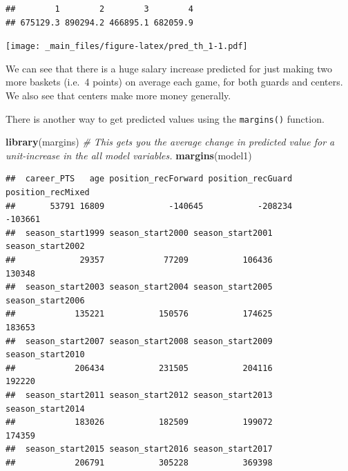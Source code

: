 \documentclass[
]{book}
\newenvironment{Shaded}{\begin{snugshade}}{\end{snugshade}}
\newcommand{\AttributeTok}[1]{\textcolor[rgb]{0.13,0.29,0.53}{#1}}
\newcommand{\CommentTok}[1]{\textcolor[rgb]{0.56,0.35,0.01}{\textit{#1}}}
\newcommand{\DecValTok}[1]{\textcolor[rgb]{0.00,0.00,0.81}{#1}}
\newcommand{\FunctionTok}[1]{\textcolor[rgb]{0.13,0.29,0.53}{\textbf{#1}}}
\newcommand{\NormalTok}[1]{#1}
\newcommand{\OtherTok}[1]{\textcolor[rgb]{0.56,0.35,0.01}{#1}}
\newcommand{\SpecialCharTok}[1]{\textcolor[rgb]{0.81,0.36,0.00}{\textbf{#1}}}
\begin{document}
\begin{verbatim}
##        1        2        3        4 
## 675129.3 890294.2 466895.1 682059.9
\end{verbatim}

\begin{Shaded}
\end{Shaded}

\texttt{[image: \_main\_files/figure-latex/pred\_th\_1-1.pdf]}

We can see that there is a huge salary increase predicted for just making two more baskets (i.e.~4 points) on average each game, for both guards and centers. We also see that centers make more money generally.

There is another way to get predicted values using the \texttt{margins()} function.

\begin{Shaded}
\begin{Highlighting}[]
\FunctionTok{library}\NormalTok{(margins)}
\CommentTok{\# This gets you the average change in predicted value for a unit{-}increase in the all model variables.}
\FunctionTok{margins}\NormalTok{(model1)}
\end{Highlighting}
\end{Shaded}

\begin{verbatim}
##  career_PTS   age position_recForward position_recGuard position_recMixed
##       53791 16809             -140645           -208234           -103661
##  season_start1999 season_start2000 season_start2001 season_start2002
##             29357            77209           106436           130348
##  season_start2003 season_start2004 season_start2005 season_start2006
##            135221           150576           174625           183653
##  season_start2007 season_start2008 season_start2009 season_start2010
##            206434           231505           204116           192220
##  season_start2011 season_start2012 season_start2013 season_start2014
##            183026           182509           199072           174359
##  season_start2015 season_start2016 season_start2017
##            206791           305228           369398
\end{verbatim}
\end{document}
